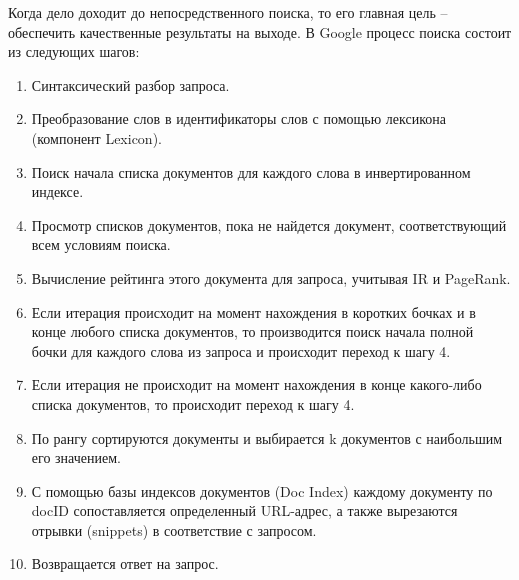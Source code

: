 Когда дело доходит до непосредственного поиска, то его главная цель -- обеспечить качественные результаты на выходе. В Google процесс поиска состоит из следующих шагов:
\begin{enumerate}
\item Синтаксический разбор запроса.
\item Преобразование слов в идентификаторы слов с помощью лексикона (компонент Lexicon).
\item Поиск начала списка документов для каждого слова в инвертированном индексе.
\item Просмотр списков документов, пока не найдется документ, соответствующий всем условиям поиска.
\item Вычисление рейтинга этого документа для запроса, учитывая IR и PageRank.
\item Если итерация происходит на момент нахождения в коротких бочках и в конце любого списка документов, то производится поиск начала полной бочки для каждого слова из запроса и происходит переход к шагу 4.
\item Если итерация не происходит на момент нахождения  в конце какого-либо списка документов, то происходит переход к шагу 4. 
\item По рангу сортируются документы и выбирается k документов с наибольшим его значением.
\item С помощью базы индексов документов (Doc Index) каждому документу по docID сопоставляется определенный URL-адрес, а также вырезаются отрывки (snippets) в соответствие с запросом.
\item Возвращается ответ на запрос.
\end{enumerate}